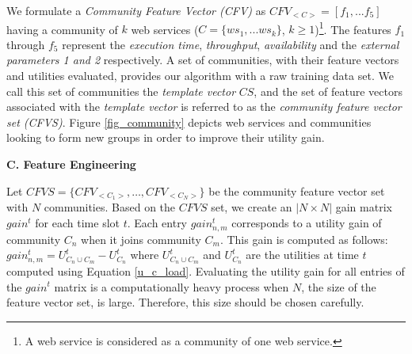 We formulate a \emph{Community Feature Vector (CFV)} as $CFV_{<C>} = [f_1,...f_5]$ having a community of $k$ web services ($C = \{ws_1,...ws_k\}$, $k \geq 1$)\footnote{A web service is considered as a community of one web service.}. The features $f_1$ through $f_5$ represent the \emph{execution time}, \emph{throughput}, \emph{availability} and the \emph{external parameters 1 and 2} respectively. A set of communities, with their feature vectors and utilities evaluated, provides our algorithm with a raw training data set. We call this set of communities the \emph{template vector} $CS$, and the set of feature vectors associated with the \emph{template vector} is referred to as the \emph{community feature vector set (CFVS)}. Figure \ref{fig_community} depicts web services and communities looking to form new groups in order to improve their utility gain.

\bigskip
\noindent \textbf {C. Feature Engineering}\label{sss:feng}

Let $CFVS = \{CFV_{<C_1>}, \dots, CFV_{<C_N>}\}$ be the community feature vector set with $N$ communities. Based on the $CFVS$ set, we create an $|N \times N|$ gain matrix $gain^{t}$ for each time slot $t$. Each entry $gain_{n,m}^{t}$ corresponds to a utility gain of community $C_n$ when it joins community $C_m$. This gain is computed as follows: $gain_{n,m}^{t} = U_{C_n \cup C_m}^{t} - U_{C_{n}}^{t}$ where $U_{C_n \cup C_m}^{t}$ and $U_{C_{n}}^{t}$ are the utilities at time $t$ computed using Equation \ref{u_c_load}.  Evaluating the utility gain for all entries of the $gain^t$ matrix is a computationally heavy process when $N$, the size  of the feature vector set, is large. Therefore, this size should be chosen carefully.

